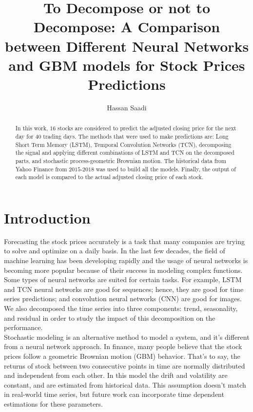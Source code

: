 \documentclass[12pt, A4]{article}
\title{To Decompose or not to Decompose: A Comparison between Different Neural Networks and GBM models for Stock Prices Predictions}
\author{Hassan Saadi}
\begin{document}
	\date{}
	\maketitle
\begin{abstract}
	In this work, $16$ stocks are considered to predict the adjusted closing price for the next day for $40$ trading days. The methods that were used to make predictions are: Long Short Term Memory (LSTM), Temporal Convolution Networks (TCN), decomposing the signal and applying different combinations of LSTM and TCN on the decomposed parts, and stochastic process-geometric Brownian motion. The historical data from Yahoo Finance from $2015$-$2018$ was used to build all the models. Finally, the output of each model is compared to the actual adjusted closing price of each stock. 

\end{abstract}

\section{Introduction}
Forecasting the stock prices accurately is a task that many companies are trying to solve and optimize on a daily basis. In the last few decades, the field of machine learning has been developing rapidly and the usage of neural networks is becoming more popular because of their success in modeling complex functions. Some types of neural networks are suited for certain tasks. For example, LSTM and TCN neural networks are good for sequences; hence, they are good for time series predictions; and convolution neural networks (CNN) are good for images. We also decomposed the time series into three components: trend, seasonality, and residual in order to study the impact of this decomposition on the performance.  \\

Stochastic modeling is an alternative method to model a system, and it's different from a neural network approach. In finance, many people believe that the stock prices follow a geometric Brownian motion (GBM) behavior. That's to say, the returns of stock between two consecutive points in time are normally distributed and independent from each other. In this model the drift and volatility are constant, and are estimated from historical data. This assumption doesn't match in real-world time series, but future work can incorporate time dependent estimations for these parameters.\\
\end{document}
